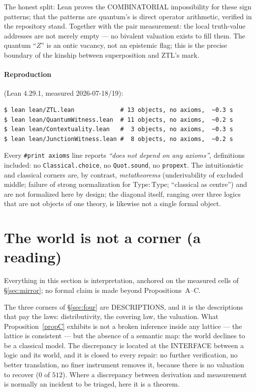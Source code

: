 \documentclass[11pt]{article}
\theoremstyle{remark}
\begin{document}
\noindent The honest split: Lean proves the COMBINATORIAL impossibility for
these sign patterns; that the patterns are quantum's is direct operator
arithmetic, verified in the repository stand. Together with the pair
measurement: the local truth-value addresses are not merely empty --- no
bivalent valuation exists to fill them. The quantum ``$Z$'' is an ontic
vacancy, not an epistemic flag; this is the precise boundary of the kinship
between superposition and ZTL's mark.

\paragraph{Reproduction} (Lean 4.29.1, measured 2026-07-18/19):

\begin{verbatim}
$ lean lean/ZTL.lean             # 13 objects, no axioms,  ~0.3 s
$ lean lean/QuantumWitness.lean  # 11 objects, no axioms,  ~0.2 s
$ lean lean/Contextuality.lean   #  3 objects, no axioms,  ~0.3 s
$ lean lean/JunctionWitness.lean #  8 objects, no axioms,  ~0.2 s
\end{verbatim}

Every \texttt{\#print axioms} line reports \emph{``does not depend on any
axioms''}, definitions included: no \texttt{Classical.choice}, no
\texttt{Quot.sound}, no \texttt{propext}. The intuitionistic and classical
corners are, by contrast, \emph{metatheorems} (underivability of excluded
middle; failure of strong normalization for $\mathrm{Type}:\mathrm{Type}$;
``classical as centre'') and are not formalized here by design; the diagonal
itself, ranging over three logics that are not objects of one theory, is
likewise not a single formal object.

\section{The world is not a corner (a reading)}\label{sec:world}

Everything in this section is interpretation, anchored on the measured cells
of \S\ref{sec:mirror}; no formal claim is made beyond
Propositions~A--C.

The three corners of \S\ref{sec:four} are DESCRIPTIONS, and it is the
descriptions that pay the laws: distributivity, the covering law, the
valuation. What Proposition~\ref{propC} exhibits is not a broken inference
inside any lattice --- the lattice is consistent --- but the absence of a
semantic map: the world declines to be a classical model. The discrepancy is
located at the INTERFACE between a logic and its world, and it is closed to
every repair: no further verification, no better translation, no finer
instrument removes it, because there is no valuation to recover ($0$ of
$512$). Where a discrepancy between derivation and measurement is normally
an incident to be triaged, here it is a theorem.
\end{document}
